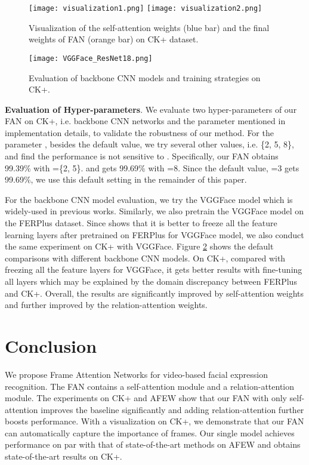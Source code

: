 \documentclass{article}
\begin{document}
\begin{figure}[tp]
\centering
\texttt{[image: visualization1.png]}
\texttt{[image: visualization2.png]}
\caption{Visualization of the self-attention weights (blue bar) and the final weights of FAN (orange bar) on CK+ dataset. }
\label{fig_Visulization}
\end{figure}

\begin{figure}[tp]
\centering
\texttt{[image: VGGFace\_ResNet18.png]}
\caption{Evaluation of backbone CNN models and training strategies on CK+.}
\label{fig_VGGResNet}
\end{figure}
\textbf{Evaluation of Hyper-parameters}.
We evaluate two hyper-parameters of our FAN on CK+, i.e. backbone CNN networks and the parameter  mentioned in implementation details, to validate the robustness of our method. 
For the parameter ,  besides the default value, we try several other values, i.e. \{2, 5, 8\}, and find the performance is not sensitive to . Specifically, our FAN obtains 99.39\% with =\{2, 5\}. and gets 99.69\% with =8. Since the default value, =3 gets 99.69\%, we use this default setting in the remainder of this paper.

For the backbone CNN model evaluation, we try the VGGFace model which is widely-used in previous works. Similarly, we also pretrain the VGGFace model on the FERPlus dataset. Since \cite{Knyazev2017Convolutional} shows that it is better to freeze all the feature learning layers after pretrained on FERPlus for VGGFace model, we also conduct the same experiment on CK+ with VGGFace.
Figure \ref{fig_VGGResNet} shows the default comparisons with different backbone CNN models.
On CK+, compared with freezing all the feature layers for VGGFace, it gets better results with fine-tuning all layers which may be explained by the domain discrepancy between FERPlus and CK+. Overall, the results are significantly improved by self-attention weights and further improved by the relation-attention weights.


\section{Conclusion}
\label{sec:conclusion}
We propose Frame Attention Networks for video-based facial expression recognition. The FAN contains a self-attention module and a relation-attention module. The experiments on CK+ and AFEW show that our FAN with only self-attention improves the baseline significantly and adding relation-attention further boosts performance. With a visualization on CK+, we demonstrate that our FAN can automatically capture the importance of frames. Our single model achieves performance on par with that of state-of-the-art methods on AFEW and obtains state-of-the-art results on CK+.








\small


\end{document}
